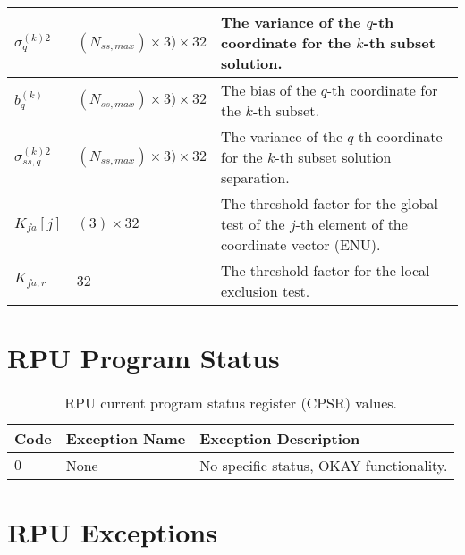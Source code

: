 \documentclass[11pt]{article}
\begin{document}
\begin{table}[htbp]
\begin{center}
\begin{tabular}{|m{1.5cm}|m{2.5cm}|m{7cm}|}
    $\sigma_q^{(k)2}$ & $(N_{ss,max}) \times 3) \times 32$ & The variance of the $q$-th coordinate for the $k$-th subset solution.\\ \hline

    $b_q^{(k)}$ & $(N_{ss,max}) \times 3) \times 32$ & The bias of the $q$-th coordinate for the $k$-th subset.\\ \hline

    $\sigma_{ss,q}^{(k)2}$ & $(N_{ss,max}) \times 3) \times 32$ & The variance of the $q$-th coordinate for the $k$-th subset solution separation.\\ \hline

    $K_{fa}[j]$ & $(3) \times 32$ & The threshold factor for the global test of the $j$-th element of the coordinate vector (ENU).\\ \hline

    $K_{fa,r}$ & $32$ & The threshold factor for the local exclusion test.\\ \hline
  \end{tabular}
\end{center}
\end{table}

\section{RPU Program Status}

\begin{table}[htbp] \begin{center}
  \caption{RPU current program status register (CPSR) values.}
  \label{tab:rpu_cpsr_codes}
  \begin{tabular}{|m{1.5cm}|m{3.5cm}|m{7cm}|}
    \hline
    \textbf{Code} & \textbf{Exception Name} & \textbf{Exception Description}\\ \hline

    $0$ & None & No specific status, OKAY functionality.\\ \hline
  \end{tabular}
\end{center}
\end{table}

\section{RPU Exceptions}
\end{document}
